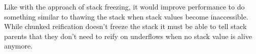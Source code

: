 Like with
the approach of stack freezing, it would improve performance to do something similar
to thawing the stack when stack values become inaccessible. While
chunked reification doesn't freeze the stack it must be able to tell
stack parents that they don't need to reify on underflows when no stack
value is alive anymore.


